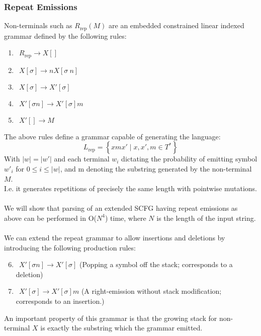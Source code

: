 \documentclass[11pt]{article}
\begin{document}
\subsubsection {Repeat Emissions}
Non-terminals such as $R_\text{rep}(M)$ are an embedded constrained linear indexed grammar
defined by the following rules:
\begin{enumerate}
\item $\ \ R_\text{rep} \rightarrow X[]$
\item $\ \ X[\sigma] \rightarrow n X[\sigma \ n]$
\item $\ \ X[\sigma] \rightarrow X'[\sigma]$
\item $\ \ X'[\sigma n] \rightarrow X'[\sigma]m$
\item $\ \ X'[] \rightarrow M$
\end{enumerate}
The above rules define a grammar capable of generating the language:
\[
 L_\text{rep} = \left \{ xmx' \mid x,x',m \in T^* \right \}
\]
With $|w| = |w'|$ and each terminal $w_i$ dictating the probability of emitting symbol $w'_i$ for $0 \le i \le |w|$,
and m denoting the substring generated by the non-terminal $M$.\\
I.e. it generates repetitions of precisely the same length with pointwise mutations.\\ \\
We will show that parsing of an extended SCFG having repeat emissions as above can be performed in O($N^4$) time,
where $N$ is the length of the input string.\\ \\
We can extend the repeat grammar to allow insertions and deletions by introducing the following production rules:
\begin{enumerate}
\setcounter{enumi}{5}
\item $\ \ X'[\sigma n] \rightarrow X'[\sigma]$ (Popping a symbol off the stack; corresponds to a deletion)
\item $\ \ X'[\sigma] \rightarrow X'[\sigma]m$ (A right-emission without stack modification; corresponds to an insertion.)
\end{enumerate}
An important property of this grammar is that the growing stack for non-terminal $X$ is exactly the substring
which the grammar emitted.
\end{document}
